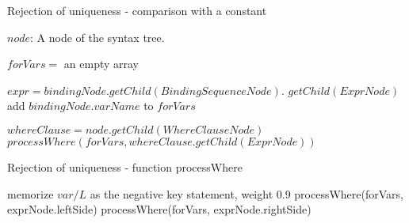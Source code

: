 \begin{algorithm}
\caption{Rejection of uniqueness - comparison with a constant}
\label{ALG_rejection_of_uniqueness_comparison_with_a_constant}
\begin{algorithmic}[1]
\REQUIRE $node$: A node of the syntax tree.

\STATE $forVars =$ an empty array

            \STATE $expr = bindingNode.getChild(BindingSequenceNode).$ $getChild(ExprNode)$
                \STATE add $bindingNode.varName$ to $forVars$
            \ENDIF
        \ENDIF
    \ENDFOR
\ENDIF

\STATE $whereClause = node.getChild(WhereClauseNode)$
    \STATE $processWhere(forVars, whereClause.getChild(ExprNode))$
\ENDIF
\end{algorithmic}
\end{algorithm}

\begin{algorithm}
\caption{Rejection of uniqueness - function processWhere}
\label{ALG_rejection_of_uniqueness_function_process_where}
\begin{algorithmic}[1]

                \STATE memorize $var/L$ as the negative key statement, weight 0.9
            \ENDIF
        \ENDFOR
        \STATE processWhere(forVars, exprNode.leftSide)
        \STATE processWhere(forVars, exprNode.rightSide)
    \ENDIF
\ENDIF

\end{algorithmic}
\end{algorithm}

